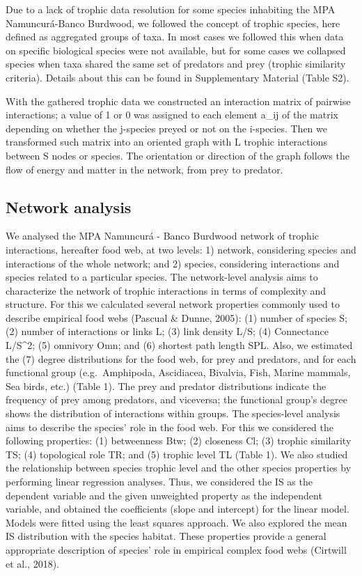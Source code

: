 \documentclass[preprint, 3p,
authoryear]{elsarticle} %
\begin{document}
Due to a lack of trophic data resolution for some species inhabiting the
MPA Namuncurá-Banco Burdwood, we followed the concept of trophic
species, here defined as aggregated groups of taxa. In most cases we
followed this when data on specific biological species were not
available, but for some cases we collapsed species when taxa shared the
same set of predators and prey (trophic similarity criteria). Details
about this can be found in Supplementary Material (Table S2).

With the gathered trophic data we constructed an interaction matrix of
pairwise interactions; a value of 1 or 0 was assigned to each element
a\_ij of the matrix depending on whether the j-species preyed or not on
the i-species. Then we transformed such matrix into an oriented graph
with L trophic interactions between S nodes or species. The orientation
or direction of the graph follows the flow of energy and matter in the
network, from prey to predator.

\hypertarget{network-analysis}{%
\subsection{Network analysis}\label{network-analysis}}

We analysed the MPA Namuncurá - Banco Burdwood network of trophic
interactions, hereafter food web, at two levels: 1) network, considering
species and interactions of the whole network; and 2) species,
considering interactions and species related to a particular species.
The network-level analysis aims to characterize the network of trophic
interactions in terms of complexity and structure. For this we
calculated several network properties commonly used to describe
empirical food webs (Pascual \& Dunne, 2005): (1) number of species S;
(2) number of interactions or links L; (3) link density L/S; (4)
Connectance L/S\^{}2; (5) omnivory Omn; and (6) shortest path length
SPL. Also, we estimated the (7) degree distributions for the food web,
for prey and predators, and for each functional group (e.g.~Amphipoda,
Ascidiacea, Bivalvia, Fish, Marine mammals, Sea birds, etc.) (Table 1).
The prey and predator distributions indicate the frequency of prey among
predators, and viceversa; the functional group's degree shows the
distribution of interactions within groups. The species-level analysis
aims to describe the species' role in the food web. For this we
considered the following properties: (1) betweenness Btw; (2) closeness
Cl; (3) trophic similarity TS; (4) topological role TR; and (5) trophic
level TL (Table 1). We also studied the relationship between species
trophic level and the other species properties by performing linear
regression analyses. Thus, we considered the IS as the dependent
variable and the given unweighted property as the independent variable,
and obtained the coefficients (slope and intercept) for the linear
model. Models were fitted using the least squares approach. We also
explored the mean IS distribution with the species habitat. These
properties provide a general appropriate description of species' role in
empirical complex food webs (Cirtwill et al., 2018).
\end{document}
